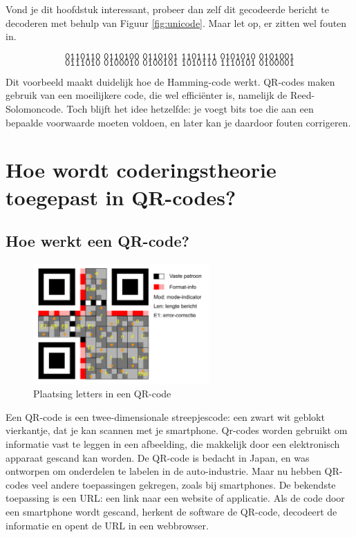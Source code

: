 \documentclass[a4paper]{article}
\begin{document}
Vond je dit hoofdstuk interessant, probeer dan zelf dit gecodeerde bericht te decoderen met behulp van Figuur \ref{fig:unicode}. Maar let op, er zitten wel fouten in.

\[\texttt{0110110 0110100 0110101 1101111 0101010 0101001}\]
\[\texttt{0111010 0100010 0100101 1010110 1110101 0100001}\]

Dit voorbeeld maakt duidelijk hoe de Hamming-code werkt. QR-codes maken gebruik van een moeilijkere code, die wel efficiënter is, namelijk de Reed-Solomoncode. Toch blijft het idee hetzelfde: je voegt bits toe die aan een bepaalde voorwaarde moeten voldoen, en later kan je daardoor fouten corrigeren.
\section{Hoe wordt coderingstheorie toegepast in QR-codes?}

\subsection{Hoe werkt een QR-code?}
\begin{figure}[htbp]
    \centering
    \includegraphics[width=0.6\textwidth]{plaatsing-letters.pdf}
    \caption[Plaatsing letters in een QR-code]{Plaatsing letters in een QR-code\footnotemark}
    \label{fig:plaatsing}
\end{figure}

Een QR-code is een twee-dimensionale streepjescode: een zwart wit geblokt vierkantje, dat je kan scannen met je smartphone. Qr-codes worden gebruikt om informatie vast te leggen in een afbeelding, die makkelijk door een elektronisch apparaat gescand kan worden. De QR-code is bedacht in Japan, en was ontworpen om onderdelen te labelen in de auto-industrie. Maar nu hebben QR-codes veel andere toepassingen gekregen, zoals bij smartphones. De bekendste toepassing is een URL: een link naar een website of applicatie. Als de code door een smartphone wordt gescand, herkent de software de QR-code, decodeert de informatie en opent de URL in een webbrowser.
\end{document}
